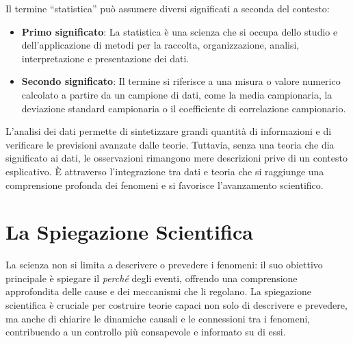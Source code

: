 \documentclass[
  letterpaper,
]{krantz}
\providecommand{\tightlist}{%
  \setlength{\itemsep}{0pt}\setlength{\parskip}{0pt}}\usepackage{longtable,booktabs,array}
\begin{document}
\begin{tcolorbox}[enhanced jigsaw, toprule=.15mm, breakable, bottomrule=.15mm, colback=white, colbacktitle=quarto-callout-note-color!10!white, left=2mm, toptitle=1mm, colframe=quarto-callout-note-color-frame, coltitle=black, opacitybacktitle=0.6, bottomtitle=1mm, titlerule=0mm, leftrule=.75mm, opacityback=0, rightrule=.15mm, title=\textcolor{quarto-callout-note-color}{\faInfo}\hspace{0.5em}{Statistica}, arc=.35mm]

Il termine ``statistica'' può assumere diversi significati a seconda del
contesto:

\begin{itemize}
\tightlist
\item
  \textbf{Primo significato}: La statistica è una scienza che si occupa
  dello studio e dell'applicazione di metodi per la raccolta,
  organizzazione, analisi, interpretazione e presentazione dei dati.
\item
  \textbf{Secondo significato}: Il termine si riferisce a una misura o
  valore numerico calcolato a partire da un campione di dati, come la
  media campionaria, la deviazione standard campionaria o il
  coefficiente di correlazione campionario.
\end{itemize}

\end{tcolorbox}

L'analisi dei dati permette di sintetizzare grandi quantità di
informazioni e di verificare le previsioni avanzate dalle teorie.
Tuttavia, senza una teoria che dia significato ai dati, le osservazioni
rimangono mere descrizioni prive di un contesto esplicativo. È
attraverso l'integrazione tra dati e teoria che si raggiunge una
comprensione profonda dei fenomeni e si favorisce l'avanzamento
scientifico.

\section{La Spiegazione Scientifica}\label{la-spiegazione-scientifica}

La scienza non si limita a descrivere o prevedere i fenomeni: il suo
obiettivo principale è spiegare il \emph{perché} degli eventi, offrendo
una comprensione approfondita delle cause e dei meccanismi che li
regolano. La spiegazione scientifica è cruciale per costruire teorie
capaci non solo di descrivere e prevedere, ma anche di chiarire le
dinamiche causali e le connessioni tra i fenomeni, contribuendo a un
controllo più consapevole e informato su di essi.
\end{document}
